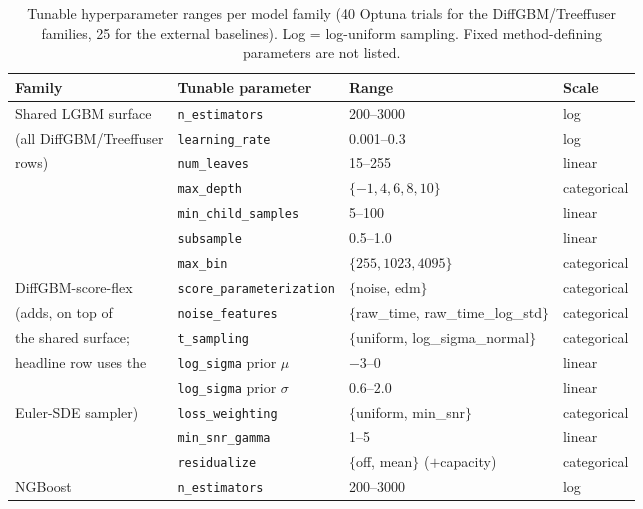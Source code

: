 \documentclass{article}
\begin{document}
\begin{table}[!h]
  \centering
  \caption{Tunable hyperparameter ranges per model family (40 Optuna trials for the DiffGBM/Treeffuser families, 25 for the external baselines). Log = log-uniform sampling. Fixed method-defining parameters are not listed.}\label{tab:tuning-spaces}
  \scriptsize
  \begin{tabular}{llll}
    \toprule
    Family & Tunable parameter & Range & Scale \\
    \midrule
    Shared LGBM surface     & \texttt{n\_estimators}     & 200--3000 & log \\
    (all DiffGBM/Treeffuser & \texttt{learning\_rate}    & 0.001--0.3 & log \\
    rows)                   & \texttt{num\_leaves}       & 15--255 & linear \\
                            & \texttt{max\_depth}        & $\{-1, 4, 6, 8, 10\}$ & categorical \\
                            & \texttt{min\_child\_samples} & 5--100 & linear \\
                            & \texttt{subsample}         & 0.5--1.0 & linear \\
                            & \texttt{max\_bin}          & $\{255, 1023, 4095\}$ & categorical \\
    \midrule
    DiffGBM-score-flex      & \texttt{score\_parameterization} & $\{$noise, edm$\}$ & categorical \\
    (adds, on top of        & \texttt{noise\_features}   & $\{$raw\_time, raw\_time\_log\_std$\}$ & categorical \\
    the shared surface;      & \texttt{t\_sampling}       & $\{$uniform, log\_sigma\_normal$\}$ & categorical \\
    headline row uses the   & \texttt{log\_sigma} prior $\mu$ & $-3$--$0$ & linear \\
                            & \texttt{log\_sigma} prior $\sigma$ & $0.6$--$2.0$ & linear \\
    Euler-SDE sampler)      & \texttt{loss\_weighting}   & $\{$uniform, min\_snr$\}$ & categorical \\
                            & \texttt{min\_snr\_gamma}   & 1--5 & linear \\
                            & \texttt{residualize}       & $\{$off, mean$\}$ ($+$capacity) & categorical \\
    \midrule
    NGBoost     & \texttt{n\_estimators}     & 200--3000 & log \\

\end{tabular}
\end{table}
\end{document}
